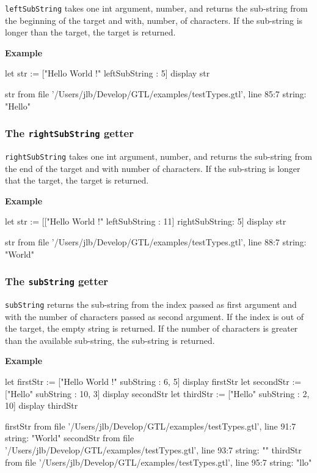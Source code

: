 \documentclass[10pt,openright,twosides,final]{memoir}
\newcommand{\gtlarg}[1]{{\footnotesize\ttfamily\colorbox{light-blue}{#1}}}
\newcommand{\gtlinline}[1]{\colorbox{light-blue}{\lstinline[language=gtl]{#1}}}
\newcommand{\example}{\vspace{.75em}\noindent\textbf{Example}\vspace{0em}}
\begin{document}
\gtlinline{leftSubString} takes one int argument, \gtlarg{number}, and returns the sub-string from the beginning of the target and with, \gtlarg{number}, of characters. If the sub-string is longer than the target, the target is returned.

\example
\begin{gtl}
let str := ["Hello World !" leftSubString : 5]
display str
\end{gtl}
\begin{console}
str from file '/Users/jlb/Develop/GTL/examples/testTypes.gtl', line 85:7
    string: "Hello"
\end{console}

\subsubsection{The \texttt{rightSubString} getter}

\gtlinline{rightSubString} takes one int argument, \gtlarg{number}, and returns the sub-string from the end of the target and with \gtlarg{number} of characters. If the sub-string is longer that the target, the target is returned.

\example
\begin{gtl}
let str := [["Hello World !" leftSubString : 11] rightSubString: 5]
display str
\end{gtl}
\begin{console}
str from file '/Users/jlb/Develop/GTL/examples/testTypes.gtl', line 88:7
    string: "World"
\end{console}

\subsubsection{The \texttt{subString} getter}

\gtlinline{subString} returns the sub-string from the \gtlarg{index} passed as first argument and with the \gtlarg{number} of characters passed as second argument. If the \gtlarg{index} is out of the target, the empty string is returned. If the number of characters is greater than the available sub-string, the sub-string is returned. 

\example
\begin{gtl}
let firstStr := ["Hello World !" subString : 6, 5]
display firstStr
let secondStr := ["Hello" subString : 10, 3]
display secondStr
let thirdStr := ["Hello" subString : 2, 10]
display thirdStr
\end{gtl}
\begin{console}
firstStr from file '/Users/jlb/Develop/GTL/examples/testTypes.gtl', line 91:7
    string: "World"
secondStr from file '/Users/jlb/Develop/GTL/examples/testTypes.gtl', line 93:7
    string: ""
thirdStr from file '/Users/jlb/Develop/GTL/examples/testTypes.gtl', line 95:7
    string: "llo"
\end{console}
\end{document}
